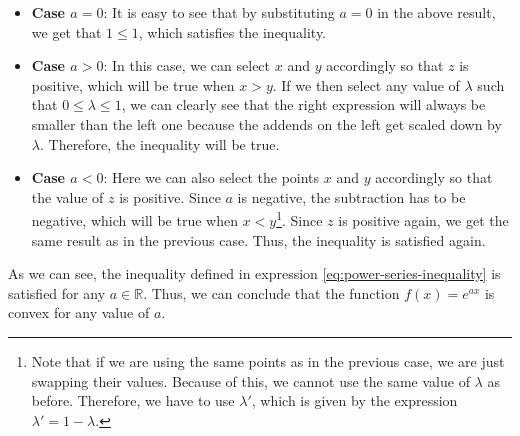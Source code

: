 \documentclass[11pt,a4paper]{article}
\begin{document}
\begin{itemize}
  \item \textbf{Case $a = 0$}: It is easy to see that by substituting $a = 0$ in the above
  result, we get that $1 \leq 1$, which satisfies the inequality.
  \item \textbf{Case $a > 0$}: In this case, we can select $x$ and $y$ accordingly so that
  $z$ is positive, which will be true when $x > y$. If we then select any value of $\lambda$ such
  that $0 \leq \lambda \leq 1$, we can clearly see that the right expression will always be
  smaller than the left one because the addends on the left get scaled down by $\lambda$.
  Therefore, the inequality will be true.
  \item \textbf{Case $a < 0$}: Here we can also select the points $x$ and $y$ accordingly
  so that the value of $z$ is positive. Since $a$ is negative, the subtraction has to be negative,
  which will be true when $x < y$\footnote{Note that if we are using the same points as in the previous
  case, we are just swapping their values. Because of this, we cannot use the same value of
  $\lambda$ as before. Therefore, we have to use $\lambda'$, which is given by the expression
  $\lambda' = 1 - \lambda$.}. 
  Since $z$ is positive again, we get the same result as in the previous case. Thus, the inequality
  is satisfied again.
\end{itemize}

As we can see, the inequality defined in expression \eqref{eq:power-series-inequality} is satisfied
for any $a \in \mathbb{R}$. Thus, we can conclude that the function $f(x) = e^{ax}$ is convex for
any value of $a$.
\end{document}
